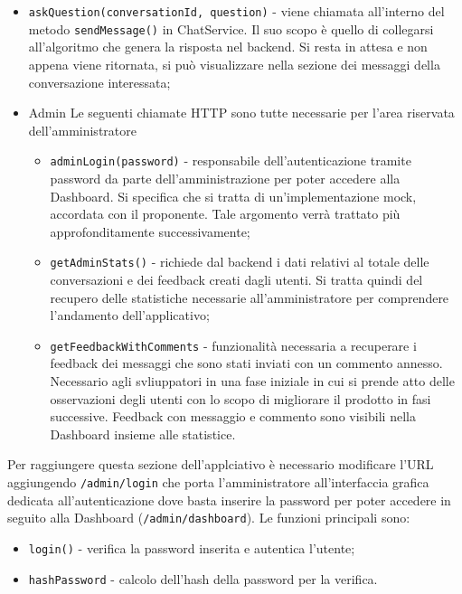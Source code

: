 \begin{itemize}
    \item \texttt{askQuestion(conversationId, question)} - viene chiamata all'interno del metodo \texttt{sendMessage()} in ChatService. Il suo scopo è quello di collegarsi all'algoritmo che genera la risposta nel backend. Si resta in attesa e non appena viene ritornata, si può visualizzare nella sezione dei messaggi della conversazione interessata;
    \item Admin 
    \newline \newline Le seguenti chiamate HTTP sono tutte necessarie per l'area riservata dell'amministratore
    \begin{itemize}
        \item \texttt{adminLogin(password)} - responsabile dell'autenticazione tramite password da parte dell'amministrazione per poter accedere alla Dashboard. Si specifica che si tratta di un'implementazione mock, accordata con il proponente. Tale argomento verrà trattato più approfonditamente successivamente;
        \item \texttt{getAdminStats()} - richiede dal backend i dati relativi al totale delle conversazioni e dei feedback creati dagli utenti. Si tratta quindi del recupero delle statistiche necessarie all'amministratore per comprendere l'andamento dell'applicativo;
        \item \texttt{getFeedbackWithComments} - funzionalità necessaria a recuperare i feedback dei messaggi che sono stati inviati con un commento annesso. Necessario agli svliuppatori in una fase iniziale in cui si prende atto delle osservazioni degli utenti con lo scopo di migliorare il prodotto in fasi successive. Feedback con messaggio e commento sono visibili nella Dashboard insieme alle statistice.
    \end{itemize}
\end{itemize}
Per raggiungere questa sezione dell'applciativo è necessario modificare l'URL aggiungendo \texttt{/admin/login} che porta l'amministratore all'interfaccia grafica dedicata all'autenticazione dove basta inserire la password per poter accedere in seguito alla Dashboard (\texttt{/admin/dashboard}). Le funzioni principali sono:
\begin{itemize}
    \item \texttt{login()} - verifica la password inserita e autentica l'utente;
    \item \texttt{hashPassword} - calcolo dell'hash della password per la verifica.
\end{itemize}

